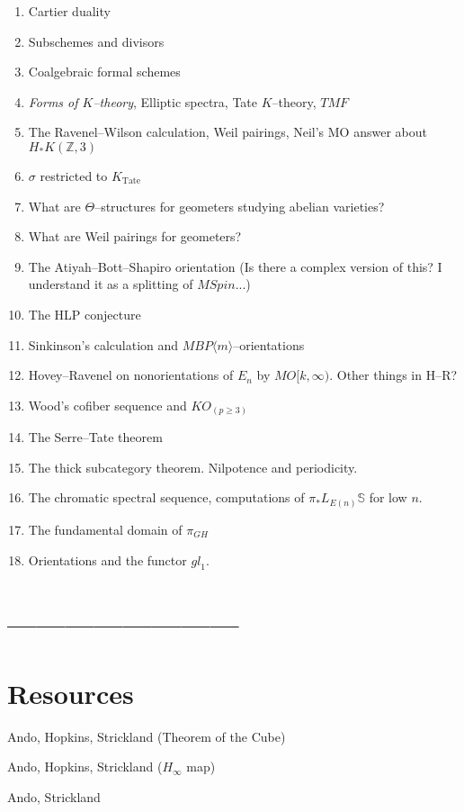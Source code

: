 \documentclass{article}
\newcommand{\Z}{\mathbb Z}
\renewcommand{\S}{\mathbb S}
\newcommand{\<}{\langle}
\renewcommand{\>}{\rangle}
\newcommand{\Spin}{\mathit{Spin}}
\newcommand{\TMF}{\mathit{TMF}}
\newcommand{\BP}{\mathit{BP}}
\newcommand{\Tate}{\mathrm{Tate}}
\newcommand{\gl}{\mathit{gl}}
\begin{document}
\begin{enumerate}
---------------------
\item Cartier duality
\item Subschemes and divisors
\item Coalgebraic formal schemes
\item \textit{Forms of $K$--theory}, Elliptic spectra, Tate $K$--theory, $\TMF$
\item The Ravenel--Wilson calculation, Weil pairings, Neil's MO answer about $H_* K(\Z, 3)$
\item $\sigma$ restricted to $K_{\Tate}$
\item What are $\Theta$--structures for geometers studying abelian varieties?
\item What are Weil pairings for geometers?
\item The Atiyah--Bott--Shapiro orientation (Is there a complex version of this? I understand it as a splitting of $M\Spin$...)
\item The HLP conjecture
\item Sinkinson's calculation and $M\BP\<m\>$--orientations
\item Hovey--Ravenel on nonorientations of $E_n$ by $MO[k, \infty)$. Other things in H--R?
\item Wood's cofiber sequence and $KO_{(p \ge 3)}$
\item The Serre--Tate theorem
\item The thick subcategory theorem.  Nilpotence and periodicity.
\item The chromatic spectral sequence, computations of $\pi_* L_{E(n)} \S$ for low $n$.
\item The fundamental domain of $\pi_{GH}$
\item Orientations and the functor $\gl_1$.
\end{enumerate}

\section{------------------------}



\section{Resources}

Ando, Hopkins, Strickland (Theorem of the Cube)

Ando, Hopkins, Strickland ($H_\infty$ map)

Ando, Strickland
\end{document}
